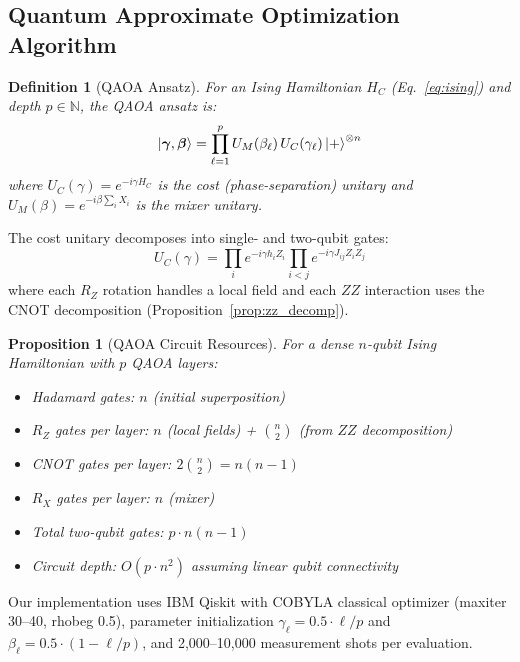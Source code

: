 \documentclass[11pt]{article}
\newcommand{\Nat}{\mathbb{N}}
\newtheorem{proposition}[theorem]{Proposition}
\newtheorem{definition}{Definition}
\begin{document}
\subsection{Quantum Approximate Optimization Algorithm}
\label{sec:qaoa_impl}

\begin{definition}[QAOA Ansatz]
For an Ising Hamiltonian $H_C$ (Eq.~\ref{eq:ising}) and depth $p \in \Nat$, the QAOA ansatz is:
\begin{equation}
\ket{\bm{\gamma}, \bm{\beta}} = \prod_{\ell=1}^{p} U_M(\beta_\ell) \, U_C(\gamma_\ell) \ket{+}^{\otimes n}
\label{eq:qaoa_ansatz}
\end{equation}
where $U_C(\gamma) = e^{-i\gamma H_C}$ is the cost (phase-separation) unitary and $U_M(\beta) = e^{-i\beta \sum_i X_i}$ is the mixer unitary.
\end{definition}

The cost unitary decomposes into single- and two-qubit gates:
\begin{equation}
U_C(\gamma) = \prod_{i} e^{-i\gamma h_i Z_i} \prod_{i<j} e^{-i\gamma J_{ij} Z_i Z_j}
\end{equation}
where each $R_Z$ rotation handles a local field and each $ZZ$ interaction uses the CNOT decomposition (Proposition~\ref{prop:zz_decomp}).

\begin{proposition}[QAOA Circuit Resources]
\label{prop:qaoa_resources}
For a dense $n$-qubit Ising Hamiltonian with $p$ QAOA layers:
\begin{itemize}
\item Hadamard gates: $n$ (initial superposition)
\item $R_Z$ gates per layer: $n$ (local fields) + $\binom{n}{2}$ (from $ZZ$ decomposition)
\item CNOT gates per layer: $2\binom{n}{2} = n(n-1)$
\item $R_X$ gates per layer: $n$ (mixer)
\item Total two-qubit gates: $p \cdot n(n-1)$
\item Circuit depth: $O(p \cdot n^2)$ assuming linear qubit connectivity
\end{itemize}
\end{proposition}

Our implementation uses IBM Qiskit with COBYLA classical optimizer (maxiter 30--40, rhobeg 0.5), parameter initialization $\gamma_\ell = 0.5 \cdot \ell / p$ and $\beta_\ell = 0.5 \cdot (1 - \ell/p)$, and 2,000--10,000 measurement shots per evaluation.
\end{document}
